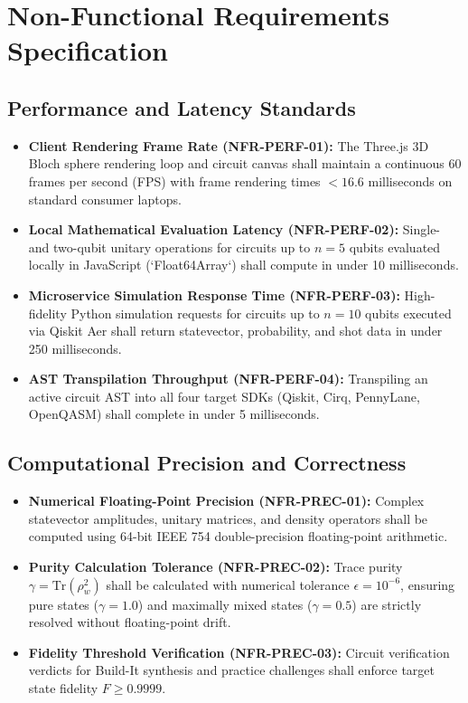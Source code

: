 \documentclass[11pt, a4paper]{article}
\begin{document}
\newpage

\section{Non-Functional Requirements Specification}

\subsection{Performance and Latency Standards}
\begin{itemize}
	\item \textbf{Client Rendering Frame Rate (NFR-PERF-01):} The Three.js 3D Bloch sphere rendering loop and circuit canvas shall maintain a continuous 60 frames per second (FPS) with frame rendering times $< 16.6$ milliseconds on standard consumer laptops.
	\item \textbf{Local Mathematical Evaluation Latency (NFR-PERF-02):} Single- and two-qubit unitary operations for circuits up to $n=5$ qubits evaluated locally in JavaScript (`Float64Array`) shall compute in under 10 milliseconds.
	\item \textbf{Microservice Simulation Response Time (NFR-PERF-03):} High-fidelity Python simulation requests for circuits up to $n=10$ qubits executed via Qiskit Aer shall return statevector, probability, and shot data in under 250 milliseconds.
	\item \textbf{AST Transpilation Throughput (NFR-PERF-04):} Transpiling an active circuit AST into all four target SDKs (Qiskit, Cirq, PennyLane, OpenQASM) shall complete in under 5 milliseconds.
\end{itemize}

\subsection{Computational Precision and Correctness}
\begin{itemize}
	\item \textbf{Numerical Floating-Point Precision (NFR-PREC-01):} Complex statevector amplitudes, unitary matrices, and density operators shall be computed using 64-bit IEEE 754 double-precision floating-point arithmetic.
	\item \textbf{Purity Calculation Tolerance (NFR-PREC-02):} Trace purity $\gamma = \text{Tr}(\rho_w^2)$ shall be calculated with numerical tolerance $\epsilon = 10^{-6}$, ensuring pure states ($\gamma = 1.0$) and maximally mixed states ($\gamma = 0.5$) are strictly resolved without floating-point drift.
	\item \textbf{Fidelity Threshold Verification (NFR-PREC-03):} Circuit verification verdicts for Build-It synthesis and practice challenges shall enforce target state fidelity $F \ge 0.9999$.
\end{itemize}
\end{document}
